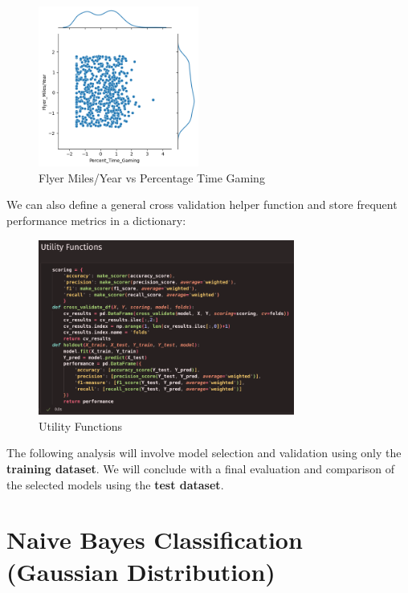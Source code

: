 \documentclass{article}
\begin{document}
    \begin{figure}[H]
        \centering
        \includegraphics[width=0.47\textwidth, height=0.3\textheight]{pre_d.png}
        \caption{\small{Flyer Miles/Year vs Percentage Time Gaming}}
    \end{figure}

    We can also define a general cross validation helper function and store frequent performance
    metrics in a dictionary:

    \begin{figure}[H]
        \centering
        \includegraphics[width=0.75\textwidth, height=0.35\textheight]{helper.png}
        \caption{\small{Utility Functions}}
    \end{figure}

    The following analysis will involve model selection and validation using only
    the \textbf{training dataset}. We will conclude with a final evaluation
    and comparison of the selected models using the \textbf{test dataset}.

    \newpage

\section*{Naive Bayes Classification (Gaussian Distribution)}
\end{document}

